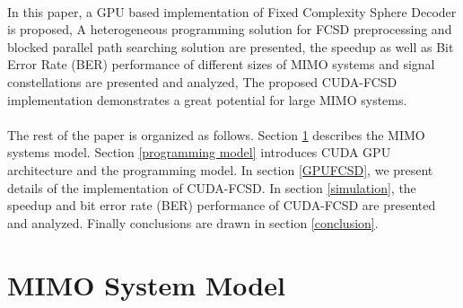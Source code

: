 \documentclass[12pt,a4paper,final]{article}
\begin{document}
\begin{spacing}{2.5}
\paragraph{}In this paper, a GPU based implementation of Fixed Complexity Sphere Decoder is proposed, A heterogeneous programming solution for FCSD preprocessing and blocked parallel path searching solution are presented, the speedup as well as Bit Error Rate (BER) performance of different sizes of MIMO systems and signal constellations are presented and analyzed, The proposed CUDA-FCSD implementation demonstrates a great potential for large MIMO systems.
\paragraph{}The rest of the paper is organized as follows. Section \ref{system} describes the MIMO systems model. Section \ref{programming model} introduces CUDA GPU architecture and the programming model. In section \ref{GPUFCSD}, we present details of the implementation of CUDA-FCSD. In section \ref{simulation}, the speedup and bit error rate (BER) performance of CUDA-FCSD are presented and analyzed. Finally conclusions are drawn in section \ref{conclusion}.    
\section{MIMO System Model}\label{system}

\end{spacing}
\end{document}
